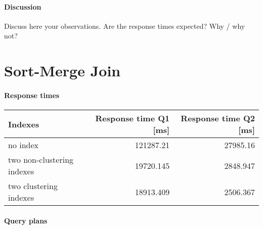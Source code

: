 \documentclass[11pt]{scrartcl}
\begin{document}
\paragraph{Discussion}
Discuss here your observations. Are the response times expected? Why / why
not? 

\section{Sort-Merge Join}

\paragraph{Response times}

\begin{flushleft}
\begin{tabular}{l|r|r}
  Indexes & Response time Q1 [ms] & Response time Q2 [ms] \\
  \hline
  no index & 121287.21 & 27985.16 \\
  two non-clustering indexes & 19720.145 & 2848.947 \\
  two clustering indexes & 18913.409 & 2506.367  \\
\end{tabular}
\end{flushleft}

\paragraph{Query plans}\mbox{}\\ 
\end{document}
